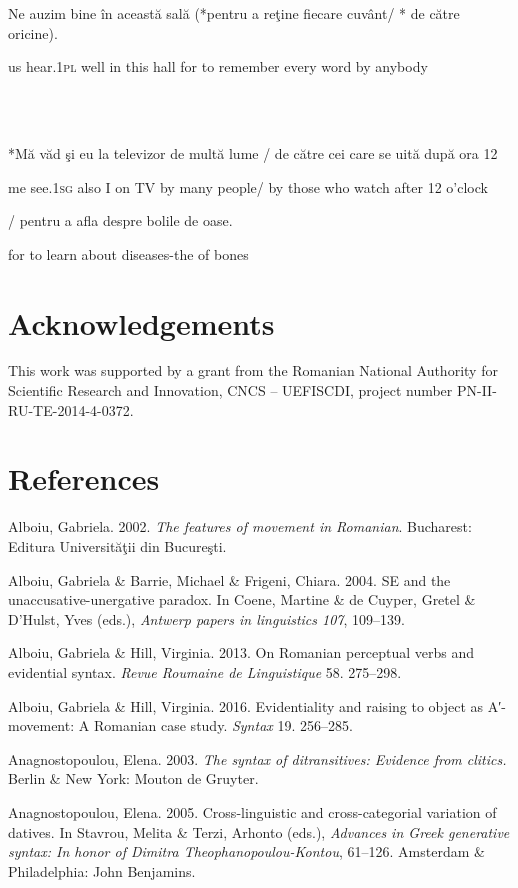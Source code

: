 \documentclass[output=paper]{langsci/langscibook}
\begin{document}
          Ne auzim    bine în această sală (*pentru a reţine        fiecare cuvânt/ * de către oricine).

us  hear.1\textsc{pl} well in this   hall       for      to remember every  word        by          anybody

\ea%
    \label{ex:key:75}
    \gll\\
        \\
    \glt
    \z

          *Mă văd      şi     eu la televizor de multă lume / de către cei care se uită    după ora 12 

me see.1\textsc{sg} also I   on TV        by many people/ by        those who watch after 12 o’clock 

 / pentru a afla despre bolile           de oase.

for    to learn about diseases-the of bones

\section{ Acknowledgements}

This work was supported by a grant from the Romanian National Authority for Scientific Research and Innovation, CNCS – UEFISCDI, project number PN-II-RU-TE-2014-4-0372.

\section{ References}

Alboiu, Gabriela. 2002. \textit{The features of movement in Romanian}. Bucharest: Editura Universităţii din Bucureşti.

Alboiu, Gabriela \& Barrie, Michael \& Frigeni, Chiara. 2004. SE and the unaccusative-unergative paradox. In Coene, Martine \& de Cuyper, Gretel \& D’Hulst, Yves (eds.), \textit{Antwerp papers in linguistics 107}, 109–139.

Alboiu, Gabriela \& Hill, Virginia. 2013. On Romanian perceptual verbs and evidential syntax. \textit{Revue Roumaine de Linguistique} 58. 275–298.

Alboiu, Gabriela \& Hill, Virginia. 2016. Evidentiality and raising to object as A′{}-movement: A Romanian case study. \textit{Syntax} 19. 256–285.

Anagnostopoulou, Elena. 2003. \textit{The syntax of ditransitives: Evidence from clitics.} Berlin \& New York: Mouton de Gruyter.

Anagnostopoulou, Elena. 2005. Cross-linguistic and cross-categorial variation of datives. In Stavrou, Melita \& Terzi, Arhonto (eds.), \textit{Advances in Greek generative syntax: In honor of Dimitra Theophanopoulou-Kontou}, 61–126. Amsterdam \& Philadelphia: John Benjamins. 
\end{document}
